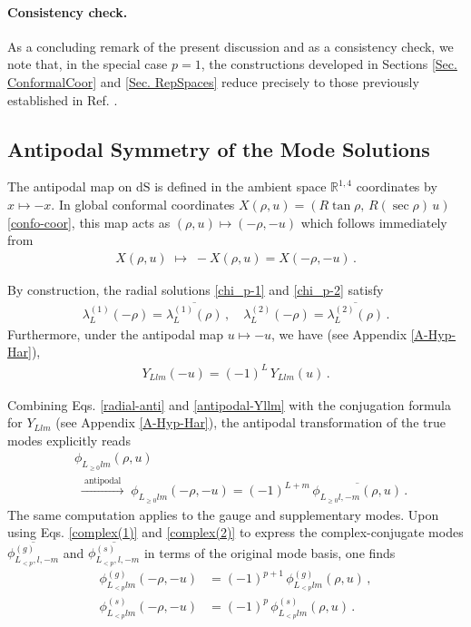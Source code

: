 \documentclass[aps,twocolumn,nofootinbib]{revtex4}
\begin{document}
\paragraph{Consistency check.} As a concluding remark of the present discussion and as a consistency check, we note that, in the special case $p=1$, the constructions developed in Sections \ref{Sec. ConformalCoor} and \ref{Sec. RepSpaces} reduce precisely to those previously established in Ref. \cite{Gazeau2000}.


\subsection{Antipodal Symmetry of the Mode Solutions}

The antipodal map on $\mathrm{dS}$ is defined in the ambient space $\mathbb{R}^{1,4}$ coordinates by $x\longmapsto -x$. In global conformal coordinates $X(\rho,u) = (R\tan\rho,\, R(\sec\rho)\,u)$ \eqref{confo-coor}, this map acts as $(\rho,u)\longmapsto(-\rho,-u)$ which follows immediately from
\begin{align}
    X(\rho,u) \;\longmapsto\; -X(\rho,u) = X(-\rho,-u) \,.
\end{align}

By construction, the radial solutions \eqref{chi_p-1} and \eqref{chi_p-2} satisfy 
\begin{align}\label{radial-anti}
    \lambda_L^{(1)}(-\rho) = \overline{\lambda_L^{(1)}(\rho)}\,,\quad \lambda_L^{(2)}(-\rho) = \overline{\lambda_L^{(2)}(\rho)}\,. 
\end{align}
Furthermore, under the antipodal map $u\longmapsto -u$, we have (see Appendix \ref{A-Hyp-Har}), 
\begin{align}\label{antipodal-Yllm}
    Y_{Llm}(-u) = (-1)^L\, Y_{Llm}(u) \,.
\end{align}

Combining Eqs. \eqref{radial-anti} and \eqref{antipodal-Yllm} with the conjugation formula for $Y_{Llm}$ (see Appendix \eqref{A-Hyp-Har}), the antipodal transformation of the true modes explicitly reads
\begin{align}\label{antipodal-all-true}
    &\phi^{}_{L^{}_{\geqslant 0}lm}(\rho,u) \nonumber\\
    &\;\xrightarrow{\text{ antipodal }}\; \phi^{}_{L^{}_{\geqslant 0}lm}(-\rho,-u) = (-1)^{L+m}\,\overline{\phi^{}_{L^{}_{\geqslant 0}l,-m}(\rho,u)} \,.
\end{align}
The same computation applies to the gauge and supplementary modes. Upon using Eqs. \eqref{complex(1)} and \eqref{complex(2)} to express the complex-conjugate modes $\overline{\phi^{(g)}_{L^{}_{<p},l,-m}}$ and $\overline{\phi^{(s)}_{L^{}_{<p},l,-m}}$ in terms of the original mode basis, one finds
\begin{align}
    \phi^{(g)}_{L^{}_{<p}lm}(-\rho,-u) &= (-1)^{p+1}\,\phi^{(g)}_{L^{}_{<p}lm}(\rho,u) \,, \label{antipodal-gauge}\\[3pt]
    \phi^{(s)}_{L^{}_{<p}lm}(-\rho,-u) &= (-1)^{p}\,\phi^{(s)}_{L^{}_{<p}lm}(\rho,u) \,. \label{antipodal-supp}
\end{align}
\end{document}
